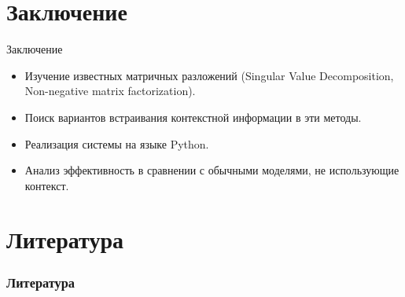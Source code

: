 \documentclass{beamer}
\begin{document}
\section{Заключение}

\begin{frame}{Заключение}
  \begin{itemize}
  \item {
    Изучение известных матричных разложений (Singular Value Decomposition, Non-negative matrix factorization).
  }
  
  \item {
    Поиск вариантов встраивания контекстной информации в эти методы.
  }
  
  \item {
    Реализация системы на языке Python.
  }

  \item {
    Анализ эффективность в сравнении с обычными моделями, не использующие контекст.
  }
  
  \end{itemize}

    \nocite{*}
\end{frame}

\section{Литература}

\begin{frame}[t,allowframebreaks]
  \frametitle{Литература}
  \printbibliography
 \end{frame}
\end{document}

